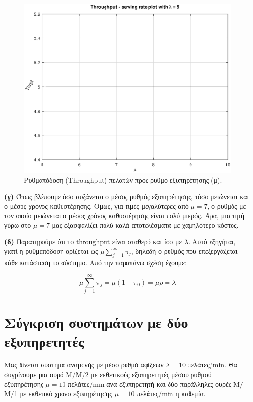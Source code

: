 \documentclass {article}
\begin{document}
\begin{figure}[ht]
	\includegraphics[width=\linewidth]{M-M-1_Thrpt_SrvRate}
	\caption{Ρυθμαπόδοση (\foreignlanguage{english}{Throughput}) πελατών προς ρυθμό εξυπηρέτησης (μ).}
	\label{fig:throughput}
\end{figure}

\textbf{(γ)} Όπως βλέπουμε όσο αυξάνεται ο μέσος ρυθμός εξυπηρέτησης, τόσο μειώνεται και ο μέσος χρόνος καθυστέρησης. Όμως, για τιμές μεγαλύτερες από $μ=7$, ο ρυθμός με τον οποίο μειώνεται ο μέσος χρόνος καθυστέρησης είναι πολύ μικρός. Άρα, μια τιμή γύρω στο $μ = 7$ μας εξασφαλίζει πολύ καλά αποτελέσματα με χαμηλότερο κόστος. 

\textbf{(δ)} Παρατηρούμε ότι το \foreignlanguage{english}{throughput} είναι σταθερό και ίσο με $λ$. Αυτό εξηγήται, γιατί η ρυθμαπόδοση ορίζεται ως $μ\sum_{j=1}^{\infty}{π_j}$, δηλαδή ο ρυθμός που επεξεργάζεται κάθε κατάσταση το σύστημα. Από την παραπάνω σχέση έχουμε:

\begin{equation}
	μ\sum_{j=1}^{\infty}{π_j} = μ(1-π_0) = μρ = λ
\end{equation}

\section*{Σύγκριση συστημάτων με δύο εξυπηρετητές}

Μας δίνεται σύστημα αναμονής με μέσο ρυθμό αφίξεων $λ = 10$ πελάτες/\foreignlanguage{english}{min}.
Θα συγρίνουμε μια ουρά Μ/Μ/2 με εκθετικούς εξυπηρετητές μέσου ρυθμού εξυπηρέτησης $μ = 10$ πελάτες/\foreignlanguage{english}{min} ανα εξυπηρετητή και δύο παράλληλες ουρές Μ/Μ/1 με εκθετικό χρόνο εξυπηρέτησης $μ = 10$ πελάτες/\foreignlanguage{english}{min} η καθεμία.
\end{document}
